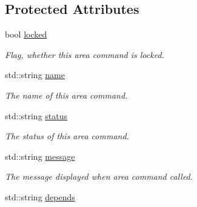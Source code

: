 \subsection*{\-Protected \-Attributes}
\begin{DoxyCompactItemize}
\item 
\hypertarget{class_area_command_a23a6e53dfc6f1d8988f41b9fc48c3048}{
bool \hyperlink{class_area_command_a23a6e53dfc6f1d8988f41b9fc48c3048}{locked}}
\label{class_area_command_a23a6e53dfc6f1d8988f41b9fc48c3048}

\begin{DoxyCompactList}\small\item\em \-Flag, whether this area command is locked. \end{DoxyCompactList}\item 
\hypertarget{class_area_command_a3295a37db88c72813df17dd9b4db060f}{
std\-::string \hyperlink{class_area_command_a3295a37db88c72813df17dd9b4db060f}{name}}
\label{class_area_command_a3295a37db88c72813df17dd9b4db060f}

\begin{DoxyCompactList}\small\item\em \-The name of this area command. \end{DoxyCompactList}\item 
\hypertarget{class_area_command_a4ba177c6d8cc7f074d0642e4fd343f14}{
std\-::string \hyperlink{class_area_command_a4ba177c6d8cc7f074d0642e4fd343f14}{status}}
\label{class_area_command_a4ba177c6d8cc7f074d0642e4fd343f14}

\begin{DoxyCompactList}\small\item\em \-The status of this area command. \end{DoxyCompactList}\item 
\hypertarget{class_area_command_af98d35c3cc1789af861eb8c2511a3d2a}{
std\-::string \hyperlink{class_area_command_af98d35c3cc1789af861eb8c2511a3d2a}{message}}
\label{class_area_command_af98d35c3cc1789af861eb8c2511a3d2a}

\begin{DoxyCompactList}\small\item\em \-The message displayed when area command called. \end{DoxyCompactList}\item 
\hypertarget{class_area_command_afab48cca59ca37d72e39f24a17fb7c0c}{
std\-::string \hyperlink{class_area_command_afab48cca59ca37d72e39f24a17fb7c0c}{depends}}
\label{class_area_command_afab48cca59ca37d72e39f24a17fb7c0c}


\end{DoxyCompactItemize}
